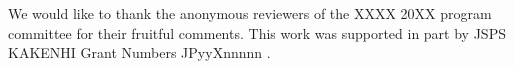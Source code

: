 \documentclass[acmsmall,screen,review,anonymous,nonacm]{acmart}
\begin{document}



\maketitle








\begin{acks}
We would like to thank the anonymous reviewers of the XXXX 20XX program
committee for their fruitful comments.
%
This work was supported in part by
%
JSPS KAKENHI Grant Numbers 
JPyyXnnnnn
.
\end{acks}





\appendix


\end{document}
